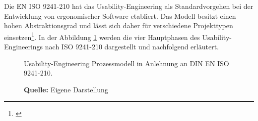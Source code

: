 Die EN ISO 9241-210 hat das Usability-Engineering als Standardvorgehen bei der Entwicklung von ergonomischer Software etabliert. Das Modell besitzt einen hohen Abstraktionsgrad und lässt sich daher für verschiedene Projekttypen einsetzen\footnote{\cite[vgl.][21]{Ecker2016}}. In der Abbildung \ref{fig:usabilityEngineeringVorgehensmodell} werden die vier Hauptphasen des Usability-Engineerings nach ISO 9241-210 dargestellt und nachfolgend erläutert.
\begin{figure}[H]
  \centering
  \caption{Usability-Engineering Prozessmodell in Anlehnung an DIN EN ISO 9241-210.}
  \caption*{\textbf{Quelle:} Eigene Darstellung}
  \label{fig:usabilityEngineeringVorgehensmodell}
\end{figure}
